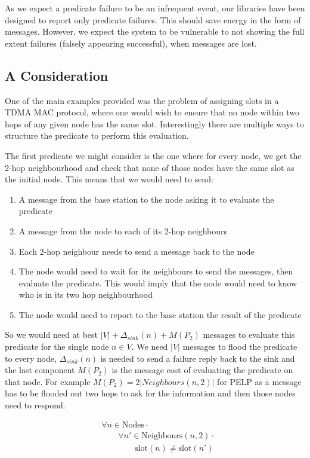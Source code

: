 As we expect a predicate failure to be an infrequent event, our libraries have been designed to report only predicate failures. This should save energy in the form of messages. However, we expect the system to be vulnerable to not showing the full extent failures (falsely appearing successful), when messages are lost.


\subsection{A Consideration}

One of the main examples provided was the problem of assigning slots in a TDMA MAC protocol, where one would wish to ensure that no node within two hops of any given node has the same slot. Interestingly there are multiple ways to structure the predicate to perform this evaluation.


The first predicate we might consider is the one where for every node, we get the 2-hop neighbourhood and check that none of those nodes have the same slot as the initial node. This means that we would need to send:
\begin{enumerate}
	\item A message from the base station to the node asking it to evaluate the predicate
	\item A message from the node to each of its 2-hop neighbours
	\item Each 2-hop neighbour needs to send a message back to the node
	\item The node would need to wait for its neighbours to send the messages, then evaluate the predicate. This would imply that the node would need to know who is in its two hop neighbourhood
	\item The node would need to report to the base station the result of the predicate
\end{enumerate}

So we would need at best $|V| + \Delta_{sink}(n) + M(P_2)$ messages to evaluate this predicate for the single node $n \in V$. We need $|V|$ messages to flood the predicate to every node, $\Delta_{sink}(n)$ is needed to send a failure reply back to the sink and the last component $M(P_{2})$ is the message cost of evaluating the predicate on that node. For example $M(P_{2}) = 2|Neighbours(n, 2)|$ for PELP as a message has to be flooded out two hops to ask for the information and then those nodes need to respond.

\begin{align}
\label{eq:2-hop-slot-pred}
& 				\forall n \in \text{Nodes} \cdot \\
& \hspace{2em}		\forall n' \in \text{Neighbours}(n, 2) \cdot \\
& \hspace{4em}			\text{slot}(n) \neq \text{slot}(n')
\end{align}

